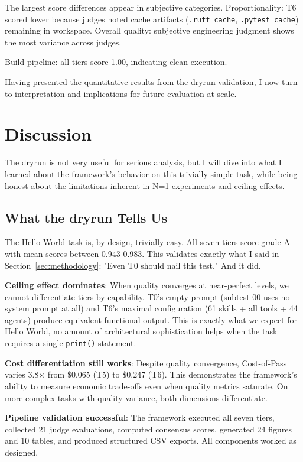 \documentclass[11pt]{article}
\begin{document}
The largest score differences appear in subjective categories. Proportionality:
T6 scored lower because judges noted cache artifacts (\texttt{.ruff\_cache},
\texttt{.pytest\_cache}) remaining in workspace. Overall quality: subjective engineering
judgment shows the most variance across judges.

Build pipeline: all tiers score 1.00, indicating clean execution.

Having presented the quantitative results from the dryrun validation, I now turn to interpretation and implications for future evaluation at scale.

\section{Discussion}\label{sec:discussion}

The dryrun is not very useful for serious analysis, but I will dive into
what I learned about the framework's behavior on this trivially simple task,
while being honest about the limitations inherent in N=1 experiments and ceiling
effects.

\subsection{What the dryrun Tells Us}

The Hello World task is, by design, trivially easy. All seven tiers score grade
A with mean scores between 0.943-0.983. This validates exactly what I said in
Section~\ref{sec:methodology}: "Even T0 should nail this test." And it did.

\textbf{Ceiling effect dominates}: When quality converges at near-perfect levels, we
cannot differentiate tiers by capability. T0's empty prompt (subtest 00 uses no
system prompt at all) and T6's maximal configuration (61 skills + all tools + 44
agents) produce equivalent functional output. This is exactly what we expect for
Hello World, no amount of architectural sophistication helps when the task
requires a single \texttt{print()} statement.

\textbf{Cost differentiation still works}: Despite quality convergence, Cost-of-Pass
varies 3.8$\times$ from \$0.065 (T5) to \$0.247 (T6). This demonstrates the framework's
ability to measure economic trade-offs even when quality metrics saturate. On
more complex tasks with quality variance, both dimensions differentiate.

\textbf{Pipeline validation successful}: The framework executed all seven tiers,
collected 21 judge evaluations, computed consensus scores, generated 24 figures
and 10 tables, and produced structured CSV exports. All components worked as
designed.
\end{document}

